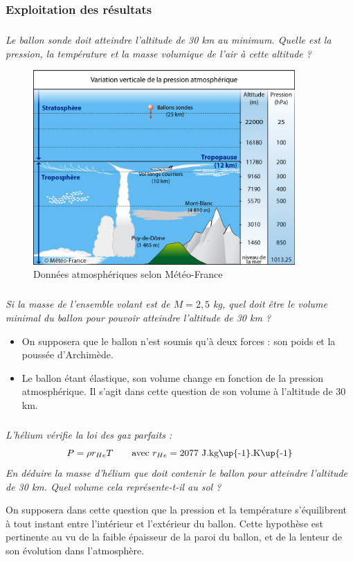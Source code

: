 \documentclass[10pt]{article}
\begin{document}
\subsubsection*{Exploitation des résultats}

\subparagraph{}
\textit{Le ballon sonde doit atteindre l'altitude de 30 km au minimum. Quelle est la pression, la température et la masse volumique de l'air à cette altitude ?}

\begin{figure}
\centering
\includegraphics[width=10cm]{images/meteofrance.jpg}
\caption{Données atmosphériques selon Météo-France}\label{fig:meteo-france}
\end{figure} 

\subparagraph{}
\textit{Si la masse de l'ensemble volant est de $M=2,5$ kg, quel doit être le volume minimal du ballon pour pouvoir atteindre l'altitude de 30 km ? }

\begin{rem}
\begin{itemize}
\item On supposera que le ballon n'est soumis qu'à deux forces : son poids et la poussée d'Archimède.
\item Le ballon étant élastique, son volume change en fonction de la pression atmosphérique. Il s'agit dans cette question de son volume à l'altitude de 30 km.
\end{itemize}
\end{rem}

\subparagraph{}
\textit{L'hélium vérifie la loi des gaz parfaits : \[P=\rho r_{He} T \qquad \text{avec } r_{He}=2077\text{ J.kg\up{-1}.K\up{-1}}\]
En déduire la masse d'hélium que doit contenir le ballon pour atteindre l'altitude de 30 km. \newline Quel volume cela représente-t-il au sol ?}

\begin{rem}
On supposera dans cette question que la pression et la température s'équilibrent à tout instant entre l'intérieur et l'extérieur du ballon. Cette hypothèse est pertinente au vu de la faible épaisseur de la paroi du ballon, et de la lenteur de son évolution dans l'atmosphère.
\end{rem}
\end{document}
